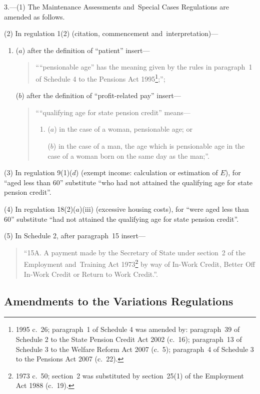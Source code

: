 \documentclass[12pt,a4paper]{article}
\begin{document}
3.---(1)  The Maintenance Assessments and~Special Cases Regulations are amended as follows.

(2) In regulation 1(2) (citation, commencement and~interpretation)—
\begin{enumerate}\item[]
($a$) after the definition of “patient” insert—
\begin{quotation}
““pensionable age” has the meaning given by the rules in paragraph~1 of Schedule 4 to the Pensions Act 1995\footnote{1995 c.~26; paragraph~1 of Schedule 4 was amended by: paragraph~39 of Schedule 2 to the State Pension Credit Act 2002  (c.~16); paragraph~13 of Schedule 3 to the Welfare Reform Act 2007 (c.~5); paragraph~4 of Schedule 3 to the Pensions Act 2007 (c.~22).};”;
\end{quotation}

($b$) after the definition of “profit-related pay” insert—
\begin{quotation}
““qualifying age for state pension credit” means—
\begin{enumerate}\item[]
($a$) 
in the case of a woman, pensionable age; or

($b$) 
in the case of a man, the age which is pensionable age in the case of a woman born on the same day as the man;”.
\end{enumerate}
\end{quotation}
\end{enumerate}

(3) In regulation 9(1)($d$)  (exempt income: calculation or estimation of $E$), for “aged less than 60” substitute “who had not attained the qualifying age for state pension credit”.

(4) In regulation 18(2)($a$)(iii) (excessive housing costs), for “were aged less than 60” substitute “had not attained the qualifying age for state pension credit”.

(5) In Schedule 2, after paragraph~15 insert—
\begin{quotation}
“15A.  A payment made by the Secretary of State under section~2 of the Employment and~Training Act 1973\footnote{1973 c.~50; section~2 was substituted by section~25(1) of the Employment Act 1988 (c.~19).} by way of In-Work Credit, Better Off In-Work Credit or Return to Work Credit.”.
\end{quotation}

\subsection[4. Amendments to the Variations Regulations]{Amendments to the Variations Regulations}
\end{document}
